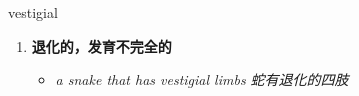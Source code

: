 
\begin{frame}
{\huge vestigial}
\begin{center}
\begin{enumerate}\Large
  \item \textbf{退化的，发育不完全的}
  \begin{itemize}
    \item \em{\Large{a snake that has vestigial limbs 蛇有退化的四肢}}
  \end{itemize}
\end{enumerate}
\end{center}
\end{frame}
